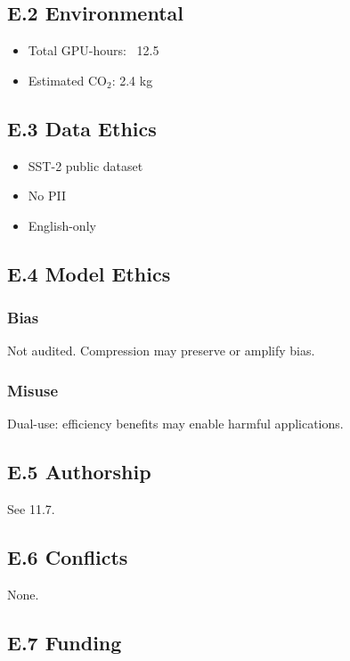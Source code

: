 \subsection{E.2 Environmental}

\begin{itemize}
\item Total GPU-hours: ~12.5
\item Estimated CO$_2$: 2.4 kg

\end{itemize}
\subsection{E.3 Data Ethics}

\begin{itemize}
\item SST-2 public dataset
\item No PII
\item English-only

\end{itemize}
\subsection{E.4 Model Ethics}

\subsubsection{Bias}
Not audited. Compression may preserve or amplify bias.

\subsubsection{Misuse}
Dual-use: efficiency benefits may enable harmful applications.

\subsection{E.5 Authorship}

See  11.7.

\subsection{E.6 Conflicts}

None.

\subsection{E.7 Funding}

